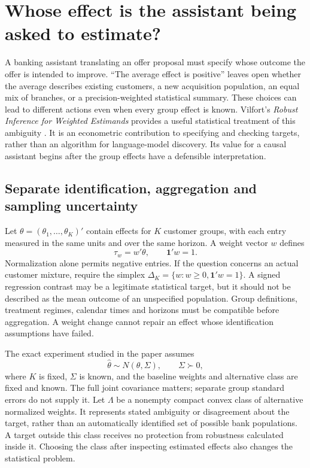 \section{Whose effect is the assistant being asked to estimate?}
\label{exec22:targets-scope}

A banking assistant translating an offer proposal must specify whose outcome
the offer is intended to improve. ``The average effect is positive'' leaves
open whether the average describes existing customers, a new acquisition
population, an equal mix of branches, or a precision-weighted statistical
summary. These choices can lead to different actions even when every group
effect is known. Vilfort's \emph{Robust Inference for Weighted Estimands}
provides a useful statistical treatment of this ambiguity
\citep{exec22_weighted_vilfort}. It is an econometric contribution to specifying
and checking targets, rather than an algorithm for language-model discovery.
Its value for a causal assistant begins after the group effects have a
defensible interpretation.

\subsection{Separate identification, aggregation and sampling uncertainty}

Let $\theta=(\theta_1,\ldots,\theta_K)'$ contain effects for $K$ customer groups,
with each entry measured in the same units and over the same horizon. A weight
vector $w$ defines
\begin{equation}
 \tau_w=w'\theta,\qquad \mathbf{1}'w=1.
 \label{exec22:targets-definition}
\end{equation}
Normalization alone permits negative entries. If the question concerns an
actual customer mixture, require the simplex
$\Delta_K=\{w:w\geq0,\mathbf{1}'w=1\}$. A signed regression contrast may be a
legitimate statistical target, but it should not be described as the mean
outcome of an unspecified population. Group definitions, treatment regimes,
calendar times and horizons must be compatible before aggregation. A weight
change cannot repair an effect whose identification assumptions have failed.

The exact experiment studied in the paper assumes
\begin{equation}
 \widehat\theta\sim N(\theta,\Sigma),\qquad \Sigma\succ0,
 \label{exec22:targets-experiment}
\end{equation}
where $K$ is fixed, $\Sigma$ is known, and the baseline weights and alternative
class are fixed and known. The full joint covariance matters; separate group
standard errors do not supply it. Let $\Lambda$ be a nonempty compact convex
class of alternative normalized weights. It represents stated ambiguity or
disagreement about the target, rather than an automatically identified set of
possible bank populations. A target outside this class receives no protection
from robustness calculated inside it. Choosing the class after inspecting
estimated effects also changes the statistical problem.

